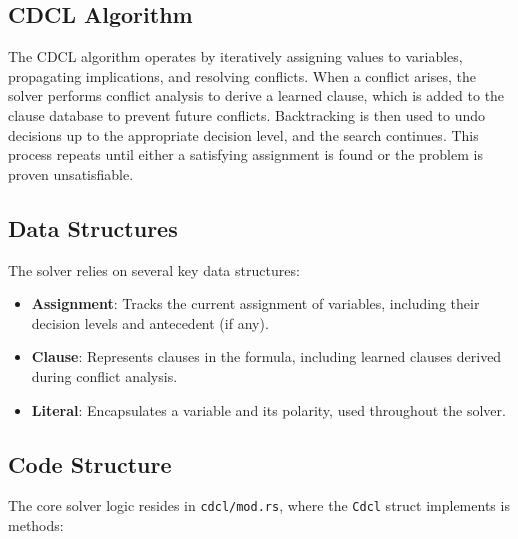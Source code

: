 \documentclass[a4paper,12pt]{article}
\begin{document}
\subsection{CDCL Algorithm}
The CDCL algorithm operates by iteratively assigning values to variables, propagating implications, and resolving conflicts. When a conflict arises, the solver performs conflict analysis to derive a learned clause, which is added to the clause database to prevent future conflicts. Backtracking is then used to undo decisions up to the appropriate decision level, and the search continues. This process repeats until either a satisfying assignment is found or the problem is proven unsatisfiable.

\subsection{Data Structures}
The solver relies on several key data structures:
\begin{itemize}
    \item \textbf{Assignment}: Tracks the current assignment of variables, including their decision levels and antecedent (if any).
    \item \textbf{Clause}: Represents clauses in the formula, including learned clauses derived during conflict analysis.
    \item \textbf{Literal}: Encapsulates a variable and its polarity, used throughout the solver.
\end{itemize}

\subsection{Code Structure}
The core solver logic resides in \texttt{cdcl/mod.rs}, where the \texttt{Cdcl} struct
implements is methods:
\end{document}
